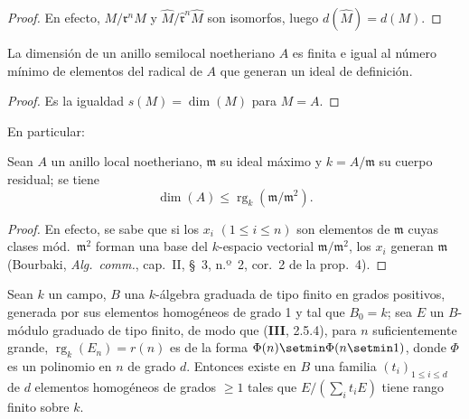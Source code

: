 
\begin{proof}
En efecto, $M/\mathfrak{r}^nM$ y
$\widehat{M}/\widehat{\mathfrak{r}}^n\widehat{M}$ son isomorfos, luego
$d(\widehat{M})=d(M)$.
\end{proof}

\begin{corollary}[16.2.5]
\label{0.16.2.5-fr}
La dimensión de un anillo semilocal noetheriano $A$ es finita e igual al número
mínimo de elementos del radical de $A$ que generan un ideal de definición.
\end{corollary}

\begin{proof}
Es la igualdad $s(M)=\dim(M)$ para $M=A$.
\end{proof}

En particular:

\begin{corollary}[16.2.6]
\label{0.16.2.6-fr}
Sean $A$ un anillo local noetheriano, $\mathfrak{m}$ su ideal máximo y
$k=A/\mathfrak{m}$ su cuerpo residual; se tiene
\begin{equation}
\label{0.16.2.6.1-fr}
\tag{16.2.6.1}
  \dim(A)\leq\operatorname{rg}_k(\mathfrak{m}/\mathfrak{m}^2).
\end{equation}
\end{corollary}

\begin{proof}
En efecto, se sabe que si los $x_i$ $(1\leq i\leq n)$ son elementos de
$\mathfrak{m}$ cuyas clases mód.~$\mathfrak{m}^2$ forman una base del
$k$-espacio vectorial $\mathfrak{m}/\mathfrak{m}^2$, los $x_i$ generan
$\mathfrak{m}$ (Bourbaki, \emph{Alg.~comm.}, cap.~II, \S~3, n.º~2, cor.~2 de
la prop.~4).
\end{proof}

\begin{proposition}[16.2.7]
\label{0.16.2.7-fr}
Sean $k$ un campo, $B$ una $k$-álgebra graduada de tipo finito en grados
positivos, generada por sus elementos homogéneos de grado 1 y tal que $B_0=k$;
sea $E$ un $B$-módulo graduado de tipo finito, de modo que \textup{(\textbf{III}, 2.5.4)}, para
$n$ suficientemente grande, $\operatorname{rg}_k(E_n)=r(n)$ es de la forma
$\Phi(n)\setmin\Phi(n\setmin 1)$, donde $\Phi$ es un polinomio en $n$ de grado $d$. Entonces
existe en $B$ una familia $(t_i)_{1\leq i\leq d}$ de $d$ elementos homogéneos
de grados $\geq1$ tales que $E/(\sum_i t_iE)$ tiene rango finito sobre $k$.
\end{proposition}

